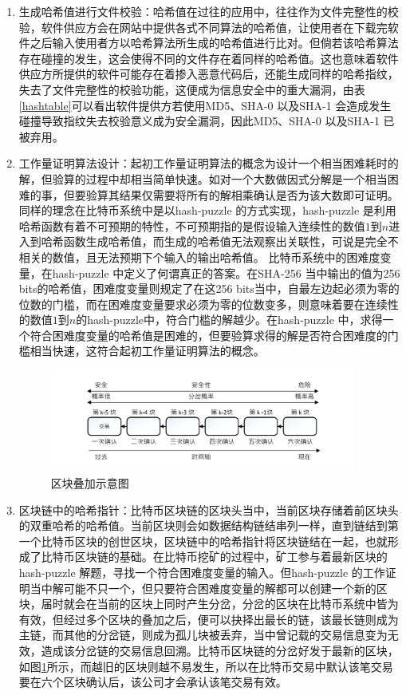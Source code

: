 				\begin{enumerate}
				\item 生成哈希值进行文件校验：哈希值在过往的应用中，往往作为文件完整性的校验，软件供应方会在网站中提供各式不同算法的哈希值，让使⽤者在下载完软件之后输⼊使⽤者方以哈希算法所⽣成的哈希值进⾏⽐对。但倘若该哈希算法存在碰撞的发生，这会使得不同的文件存在着同样的哈希值。这也意味着软件供应方所提供的软件可能存在着掺入恶意代码后，还能生成同样的哈希指纹，失去了文件完整性的校验功能，这便成为信息安全中的重大漏洞，由表\ref{hashtable}可以看出软件提供方若使用MD5、SHA-0 以及SHA-1 会造成发生碰撞导致指纹失去校验意义成为安全漏洞，因此MD5、SHA-0 以及SHA-1 已被弃用。

				\item 工作量证明算法设计：起初工作量证明算法的概念为设计一个相当困难耗时的解，但验算的过程中却相当简单快速。如对一个大数做因式分解是一个相当困难的事，但要验算其结果仅需要将所有的解相乘确认是否为该大数即可证明。同样的理念在比特币系统中是以hash-puzzle 的方式实现，hash-puzzle 是利用哈希函数有着不可预期的特性，不可预期指的是假设输入连续性的数值$1$到$n$进入到哈希函数生成哈希值，而生成的哈希值无法观察出关联性，可说是完全不相关的数值，且无法预期下个输入的输出哈希值。
				比特币系统中的困难度变量，在hash-puzzle 中定义了何谓真正的答案。在SHA-256 当中输出的值为256 bits的哈希值，困难度变量则规定了在这256 bits当中，自最左边起必须为零的位数的门槛，而在困难度变量要求必须为零的位数变多，则意味着要在连续性的数值$1$到$n$的hash-puzzle中，符合门槛的解越少。在hash-puzzle 中，求得一个符合困难度变量的哈希值是困难的，但要验算求得的解是否符合困难度的门槛相当快速，这符合起初工作量证明算法的概念。

				\begin{figure}[!htbp]
					\centering
					\includegraphics[width = 0.95\textwidth]{6confirm.pdf}
					\caption{区块叠加示意图}\label{6confirm}
				\end{figure}

				\item 区块链中的哈希指针：比特币区块链的区块头当中，当前区块存储着前区块头的双重哈希的哈希值。当前区块则会如数据结构链结串列一样，直到链结到第一个比特币区块的创世区块，区块链中的哈希指针将区块链结在一起，也就形成了比特币区块链的基础。在比特币挖矿的过程中，矿工参与着最新区块的hash-puzzle 解题，寻找一个符合困难度变量的输入。但hash-puzzle  的工作证明当中解可能不只一个，但只要符合困难度变量的解都可以创建一个新的区块，届时就会在当前的区块上同时产生分岔，分岔的区块在比特币系统中皆为有效，但经过多个区块的叠加之后，便可以抉择出最长的链，该最长链则成为主链，而其他的分岔链，则成为孤儿块被丢弃，当中曾记载的交易信息变为无效，造成该分岔链的交易信息回溯。比特币区块链的分岔好发于最新的区块，如图\ref{6confirm}所示，而越旧的区块则越不易发生，所以在比特币交易中默认该笔交易要在六个区块确认后，该公司才会承认该笔交易有效。

				\end{enumerate}

